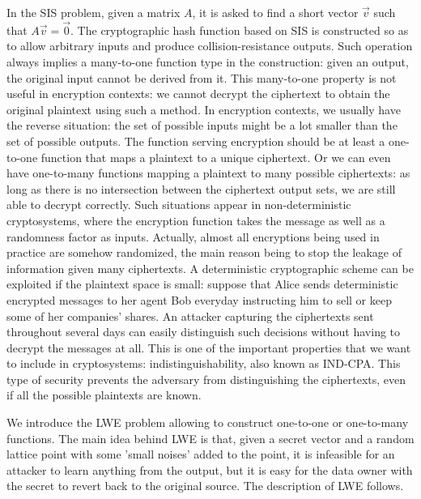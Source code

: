 In the SIS problem, given a matrix $A$, it is asked to find a short vector
$\vec{v}$ such that $A\vec{v} = \vec{0}$. The cryptographic hash function 
 based on SIS is constructed so as to allow arbitrary inputs and
produce collision-resistance outputs. Such operation always implies a
many-to-one function type in the construction: given an output, the original input cannot be derived from it. This many-to-one property is not useful
in encryption contexts: we cannot decrypt the ciphertext to obtain the original
plaintext using such a method. In encryption contexts, we usually have the reverse
situation: the set of possible inputs might be a lot smaller than the set of
possible outputs. The function serving encryption should be at least a
one-to-one function that maps a plaintext to a unique ciphertext. Or we can even
have one-to-many functions mapping a plaintext to many possible ciphertexts: as
long as there is no intersection between the ciphertext output sets, we are
still able to decrypt correctly. Such situations appear in non-deterministic
cryptosystems, where the encryption function takes the message as well as a
randomness factor as inputs. Actually, almost all encryptions being used in
practice are somehow randomized, the main reason being to stop the leakage of
information given many ciphertexts. A deterministic cryptographic scheme can be
exploited if the plaintext space is small: suppose that Alice sends deterministic encrypted messages to her agent Bob everyday instructing him to sell or keep some of her companies' shares.  An attacker capturing the ciphertexts sent throughout several days can easily distinguish such decisions without having to decrypt the messages at all. This is one of the important properties that we want to include in cryptosystems: indistinguishability, also known as IND-CPA. This type of security prevents the adversary from distinguishing
the ciphertexts, even if all the possible plaintexts are known.

We introduce the LWE problem \cite{regev2005lattices} allowing to construct
one-to-one or one-to-many functions. The main idea behind LWE is that, given a secret
vector and a random lattice point with some 'small noises' added to the point,
it is infeasible for an attacker to learn anything from the output, but it is
easy for the data owner with the secret to revert back to the original source. The
description of LWE follows.


